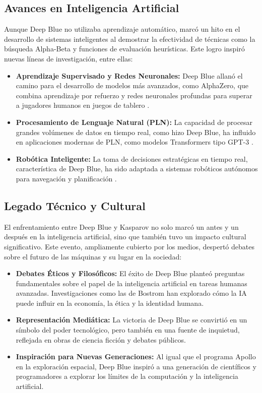 \documentclass[12pt,a4paper]{article}
\begin{document}
\subsection{Avances en Inteligencia Artificial}

Aunque Deep Blue no utilizaba aprendizaje automático, marcó un hito en el desarrollo de sistemas inteligentes al demostrar la efectividad de técnicas como la búsqueda Alpha-Beta y funciones de evaluación heurísticas. Este logro inspiró nuevas líneas de investigación, entre ellas:

\begin{itemize}
    \item \textbf{Aprendizaje Supervisado y Redes Neuronales:} Deep Blue allanó el camino para el desarrollo de modelos más avanzados, como AlphaZero, que combina aprendizaje por refuerzo y redes neuronales profundas para superar a jugadores humanos en juegos de tablero \cite{silver2018general}.
    \item \textbf{Procesamiento de Lenguaje Natural (PLN):} La capacidad de procesar grandes volúmenes de datos en tiempo real, como hizo Deep Blue, ha influido en aplicaciones modernas de PLN, como modelos Transformers tipo GPT-3 \cite{brown2020language}.
    \item \textbf{Robótica Inteligente:} La toma de decisiones estratégicas en tiempo real, característica de Deep Blue, ha sido adaptada a sistemas robóticos autónomos para navegación y planificación \cite{kober2013reinforcement}.
\end{itemize}

\subsection{Legado Técnico y Cultural}

El enfrentamiento entre Deep Blue y Kasparov no solo marcó un antes y un después en la inteligencia artificial, sino que también tuvo un impacto cultural significativo. Este evento, ampliamente cubierto por los medios, despertó debates sobre el futuro de las máquinas y su lugar en la sociedad:

\begin{itemize}
    \item \textbf{Debates Éticos y Filosóficos:} El éxito de Deep Blue planteó preguntas fundamentales sobre el papel de la inteligencia artificial en tareas humanas avanzadas. Investigaciones como las de Bostrom \cite{bostrom2014superintelligence} han explorado cómo la IA puede influir en la economía, la ética y la identidad humana.
    \item \textbf{Representación Mediática:} La victoria de Deep Blue se convirtió en un símbolo del poder tecnológico, pero también en una fuente de inquietud, reflejada en obras de ciencia ficción y debates públicos.
    \item \textbf{Inspiración para Nuevas Generaciones:} Al igual que el programa Apollo en la exploración espacial, Deep Blue inspiró a una generación de científicos y programadores a explorar los límites de la computación y la inteligencia artificial.
\end{itemize}
\end{document}
